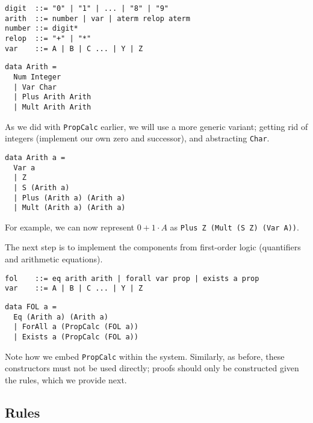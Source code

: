 \documentclass{article}
\begin{document}
\begin{minipage}{0.49\textwidth}
\begin{lstlisting}
digit  ::= "0" | "1" | ... | "8" | "9"
arith  ::= number | var | aterm relop aterm
number ::= digit*
relop  ::= "+" | "*"
var    ::= A | B | C ... | Y | Z
\end{lstlisting}
\end{minipage}
\begin{minipage}{0.49\textwidth}
\begin{lstlisting}
data Arith =
  Num Integer
  | Var Char
  | Plus Arith Arith
  | Mult Arith Arith
\end{lstlisting}
\end{minipage}

As we did with \texttt{PropCalc} earlier, we will use a more generic variant; getting rid of integers (implement our own zero and successor), and abstracting \texttt{Char}.

\begin{lstlisting}
data Arith a =
  Var a
  | Z
  | S (Arith a)
  | Plus (Arith a) (Arith a)
  | Mult (Arith a) (Arith a)
\end{lstlisting}

For example, we can now represent $0 + 1 \cdot A$ as \texttt{Plus Z (Mult (S Z) (Var A))}.

The next step is to implement the components from first-order logic (quantifiers and arithmetic equations).

\begin{minipage}{0.49\textwidth}
\begin{lstlisting}
fol    ::= eq arith arith | forall var prop | exists a prop
var    ::= A | B | C ... | Y | Z
\end{lstlisting}
\end{minipage}
\begin{minipage}{0.49\textwidth}
\begin{lstlisting}
data FOL a =
  Eq (Arith a) (Arith a)
  | ForAll a (PropCalc (FOL a))
  | Exists a (PropCalc (FOL a))
\end{lstlisting}
\end{minipage}

Note how we embed \texttt{PropCalc} within the system. Similarly, as before, these constructors must not be used directly; proofs should only be constructed given the rules, which we provide next.

\subsection{Rules}
\end{document}
